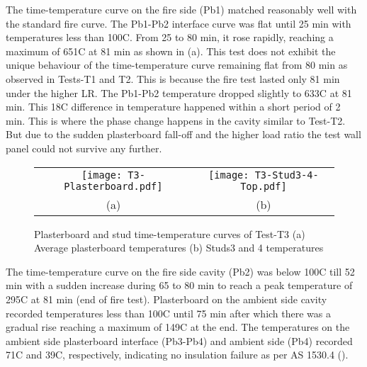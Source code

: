 The time-temperature curve on the fire side (Pb1) matched reasonably well with the standard fire curve. The Pb1-Pb2 interface curve was flat until 25 min with temperatures less than 100\degree C. From 25 to 80 min, it rose rapidly, reaching a maximum of 651\degree C at 81 min as shown in  (a). This test does not exhibit the unique behaviour of the time-temperature curve remaining flat from 80 min as observed in Tests-T1 and T2. This is because the fire test lasted only 81 min under the higher LR. The Pb1-Pb2 temperature dropped slightly to 633\degree C at 81 min. This 18\degree C difference in temperature happened within a short period of 2 min. This is where the phase change happens in the cavity similar to Test-T2. But due to the sudden plasterboard fall-off and the higher load ratio the test wall panel could not survive any further.
	\begin{figure}[!htbp]
		\centering
			\begin{tabular}{cc}
				\texttt{[image: T3-Plasterboard.pdf]} & \texttt{[image: T3-Stud3-4-Top.pdf]} \\ 
				(a) & (b)  \\ 
			\end{tabular} 
			\caption{Plasterboard and stud time-temperature curves of Test-T3 (a) Average plasterboard temperatures (b) Studs3 and 4 temperatures}
			\label{fig:T3-PB-Stud}
	\end{figure}

The time-temperature curve on the fire side cavity (Pb2) was below 100\degree C till 52 min with a sudden increase during 65 to 80 min to reach a peak temperature of 295\degree C at 81 min (end of fire test). Plasterboard on the ambient side cavity recorded temperatures less than 100\degree C until 75 min after which there was a gradual rise reaching a maximum of 149\degree C at the end. The temperatures on the ambient side plasterboard interface (Pb3-Pb4) and ambient side (Pb4) recorded 71\degree C and 39\degree C, respectively, indicating no insulation failure as per AS 1530.4 (\citet{StandardsAustral2014}).

